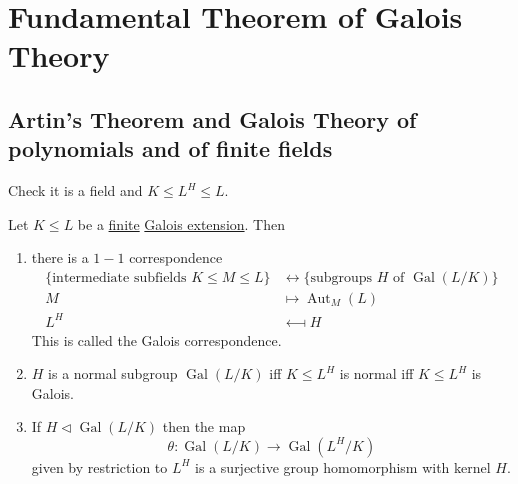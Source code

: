 \documentclass{article}
\DeclareMathOperator{\Aut}{Aut}
\DeclareMathOperator{\Gal}{Gal}
\begin{document}
\clearpage
\section{Fundamental Theorem of Galois Theory}
\subsection{Artin's Theorem and Galois Theory of polynomials and of finite fields}

\begin{ex}
    Check it is a field and $K \leq L^H \leq L$.
\end{ex}

\begin{nthm}\label{thm:3.2}
    Let $K \leq L$ be a \hyperlink{def:degreeOfFieldExt}{finite} \hyperlink{def:galoisExt}{Galois extension}.
    Then
    \begin{enumerate}[label=(\roman*)]
        \item there is a $1-1$ correspondence
            \begin{align*}
                \{\text{intermediate subfields } K \leq M \leq L\} &\longleftrightarrow \{\text{subgroups $H$ of } \Gal(L/K)\} \\
                M &\longmapsto \Aut_M(L) \\
                L^H &\longmapsfrom H
            \end{align*}
            This is called the Galois correspondence.
        \item $H$ is a normal subgroup $\Gal(L/K)$ iff $K \leq L^H$ is normal iff $K \leq L^H$ is Galois.
        \item If $H \lhd \Gal(L/K)$ then the map
            \begin{equation*}
                \theta: \Gal(L/K) \longrightarrow \Gal(L^H/K)
            \end{equation*}
            given by restriction to $L^H$ is a surjective group homomorphism with kernel $H$.
    \end{enumerate}
\end{nthm}
\end{document}
